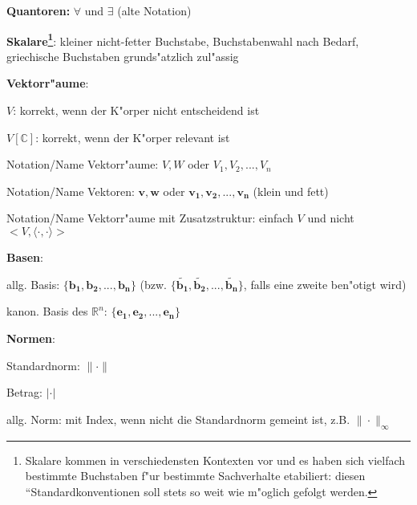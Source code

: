 \begin{list_sabina}
\item
\textbf{Quantoren:} $\forall$ und $\exists$ (alte Notation)
\item
\textbf{Skalare\footnote{Skalare kommen in verschiedensten Kontexten vor 
und es haben sich vielfach bestimmte Buchstaben f"ur bestimmte Sachverhalte 
etabiliert: diesen ``Standardkonventionen soll stets so weit wie m"oglich 
gefolgt werden.}}: kleiner nicht-fetter Buchstabe, Buchstabenwahl nach 
Bedarf, griechische Buchstaben grunds"atzlich zul"assig
\item
\textbf{Vektorr"aume}:
        \begin{sub_list_sabina}
        \item
        $V$: korrekt, wenn der K"orper nicht entscheidend ist
        \item
        $V [\mathbb{C}]$: korrekt, wenn der K"orper relevant ist
        \item
        Notation/Name Vektorr"aume: $V, W$ oder $V_{1},V_{2},...,V_{n}$ 
        \item
        Notation/Name Vektoren: $\mathbf{v}, \mathbf{w}$ oder 
        $\mathbf{v_{1}},\mathbf{v_{2}},...,\mathbf{v_{n}}$ (klein und fett)
        \item
        Notation/Name Vektorr"aume mit Zusatzstruktur: einfach $V$ und
        nicht $<V, \langle \cdot, \cdot \rangle>$
        \end{sub_list_sabina}
\item
\textbf{Basen}:
        \begin{sub_list_sabina}
        \item
        allg. Basis: $\{\mathbf{b_{1}}, \mathbf{b_{2}}, ..., \mathbf{b_{n}}\}$ 
        (bzw. $\{\tilde{\mathbf{b_{1}}}, \tilde{\mathbf{b_{2}}}, ..., \tilde{\mathbf{b_{n}}}\}$, falls eine zweite ben"otigt wird)
        \item
        kanon. Basis des $\mathbb{R}^{n}$: $\{\mathbf{e_{1}}, \mathbf{e_{2}}, ..., \mathbf{e_{n}}\}$
        \end{sub_list_sabina}
\item
\textbf{Normen}:
        \begin{sub_list_sabina}
        \item
        Standardnorm: $\| \cdot \|$
        \item
        Betrag: $| \cdot |$
        \item
        allg. Norm: mit Index, wenn nicht die Standardnorm gemeint ist, z.B. 
        $\| \cdot \|_{\infty}$

\end{sub_list_sabina}
\end{list_sabina}
